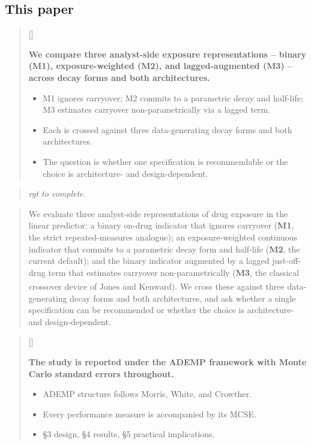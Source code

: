 \documentclass[
  11pt,
]{article}
\newcounter{pgraph}
\newenvironment{bullets}{%
  \stepcounter{pgraph}%
  \begin{quote}\small\sffamily\color[gray]{0.30}%
  {\normalfont\scriptsize\color[gray]{0.58}[\thepgraph]\enspace}}{%
  \end{quote}}
\newenvironment{rgt}{%
  \begin{quote}\small\itshape\color[RGB]{20,60,160}}{%
  \end{quote}}
\newenvironment{orig}{%
  \begin{quote}\normalsize\color[gray]{0.55}}{%
  \end{quote}}
\begin{document}
\subsection{This paper}\label{this-paper}

\begin{bullets}

\textbf{We compare three analyst-side exposure representations --
binary (M1), exposure-weighted (M2), and lagged-augmented (M3) --
across decay forms and both architectures.}

\begin{itemize}\setlength{\itemsep}{2pt}\setlength{\parskip}{0pt}
\item M1 ignores carryover; M2 commits to a parametric decay and
half-life; M3 estimates carryover non-parametrically via a lagged
term.
\item Each is crossed against three data-generating decay forms and
both architectures.
\item The question is whether one specification is recommendable or
the choice is architecture- and design-dependent.
\end{itemize}

\end{bullets}

\begin{rgt}
rgt to complete.

\end{rgt}

\begin{orig}
We evaluate three analyst-side representations of drug exposure in
the linear predictor: a binary on-drug indicator that ignores
carryover (\textbf{M1}, the strict repeated-measures analogue); an
exposure-weighted continuous indicator that commits to a parametric
decay form and half-life (\textbf{M2}, the current default); and the
binary indicator augmented by a lagged just-off-drug term that
estimates carryover non-parametrically (\textbf{M3}, the classical
crossover device of Jones and Kenward\textsuperscript{}). We
cross these against three data-generating decay forms and both
architectures, and ask whether a single specification can be
recommended or whether the choice is architecture- and
design-dependent.

\end{orig}

\begin{bullets}

\textbf{The study is reported under the ADEMP framework with Monte
Carlo standard errors throughout.}

\begin{itemize}\setlength{\itemsep}{2pt}\setlength{\parskip}{0pt}
\item ADEMP structure follows Morris, White, and Crowther.
\item Every performance measure is accompanied by its MCSE.
\item §3 design, §4 results, §5 practical implications.
\end{itemize}

\end{bullets}
\end{document}

